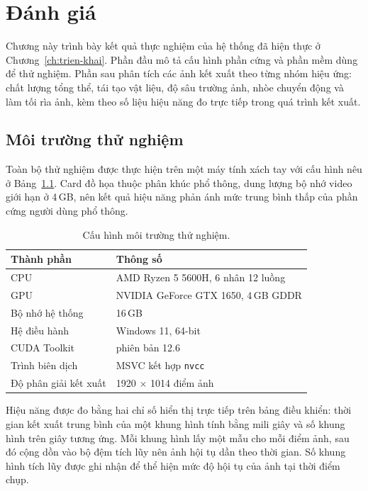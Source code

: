 \chapter{Đánh giá}
\label{ch:danh-gia}

Chương này trình bày kết quả thực nghiệm của hệ thống đã hiện thực ở
Chương~\ref{ch:trien-khai}. Phần đầu mô tả cấu hình phần cứng và phần mềm dùng
để thử nghiệm. Phần sau phân tích các ảnh kết xuất theo từng nhóm hiệu ứng:
chất lượng tổng thể, tái tạo vật liệu, độ sâu trường ảnh, nhòe chuyển động và làm
tối rìa ảnh, kèm theo số liệu hiệu năng đo trực tiếp trong quá trình kết xuất.

\section{Môi trường thử nghiệm}
Toàn bộ thử nghiệm được thực hiện trên một máy tính xách tay với cấu hình nêu ở
Bảng~\ref{tab:moi-truong}. Card đồ họa thuộc phân khúc phổ thông, dung lượng bộ
nhớ video giới hạn ở 4\,GB, nên kết quả hiệu năng phản ánh mức trung bình thấp
của phần cứng người dùng phổ thông.

\begin{table}[H]
  \centering
  \caption{Cấu hình môi trường thử nghiệm.}
  \label{tab:moi-truong}
  \begin{tabularx}{\textwidth}{l X}
    \toprule
    \textbf{Thành phần} & \textbf{Thông số} \\
    \midrule
    CPU              & AMD Ryzen 5 5600H, 6 nhân 12 luồng \\
    GPU              & NVIDIA GeForce GTX 1650, 4\,GB GDDR \\
    Bộ nhớ hệ thống  & 16\,GB \\
    Hệ điều hành     & Windows 11, 64-bit \\
    CUDA Toolkit     & phiên bản 12.6 \\
    Trình biên dịch  & MSVC kết hợp \texttt{nvcc} \\
    Độ phân giải kết xuất & 1920 $\times$ 1014 điểm ảnh \\
    \bottomrule
  \end{tabularx}
\end{table}

Hiệu năng được đo bằng hai chỉ số hiển thị trực tiếp trên bảng điều khiển: thời
gian kết xuất trung bình của một khung hình tính bằng mili giây và số khung hình
trên giây tương ứng. Mỗi khung hình lấy một mẫu cho mỗi điểm ảnh, sau đó cộng dồn
vào bộ đệm tích lũy nên ảnh hội tụ dần theo thời gian. Số khung hình tích lũy
được ghi nhận để thể hiện mức độ hội tụ của ảnh tại thời điểm chụp.

